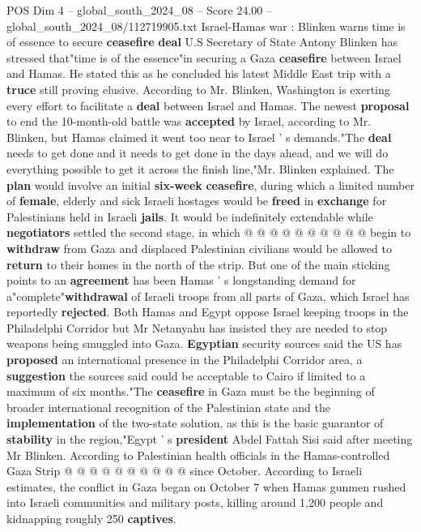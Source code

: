 \begin{textsample}{POS Dim 4 – global\_south\_2024\_08 – Score 24.00 – global\_south\_2024\_08/112719905.txt}  \label{ex:f4_pos_124}
Israel-Hamas war : Blinken warns time is of essence to secure \textbf{ceasefire} \textbf{deal} U.S Secretary of State Antony Blinken has stressed that"time is of the essence"in securing a Gaza \textbf{ceasefire} between Israel and Hamas.
He stated this as he concluded his latest Middle East trip with a \textbf{truce} still proving elusive.
According to Mr.
Blinken, Washington is exerting every effort to facilitate a \textbf{deal} between Israel and Hamas.
The newest \textbf{proposal} to end the 10-month-old battle was \textbf{accepted} by Israel, according to Mr.
Blinken, but Hamas claimed it went too near to Israel ' s demands."The \textbf{deal} needs to get done and it needs to get done in the days ahead, and we will do everything possible to get it across the finish line,"Mr.
Blinken explained.
The \textbf{plan} would involve an initial \textbf{six-week} \textbf{ceasefire}, during which a limited number of \textbf{female}, elderly and sick Israeli hostages would be \textbf{freed} in \textbf{exchange} for Palestinians held in Israeli \textbf{jails}.
It would be indefinitely extendable while \textbf{negotiators} settled the second stage, in which @ @ @ @ @ @ @ @ @ @ begin to \textbf{withdraw} from Gaza and displaced Palestinian civilians would be allowed to \textbf{return} to their homes in the north of the strip.
But one of the main sticking points to an \textbf{agreement} has been Hamas ' s longstanding demand for a"complete"\textbf{withdrawal} of Israeli troops from all parts of Gaza, which Israel has reportedly \textbf{rejected}.
Both Hamas and Egypt oppose Israel keeping troops in the Philadelphi Corridor but Mr Netanyahu has insisted they are needed to stop weapons being smuggled into Gaza. \textbf{Egyptian} security sources said the US has \textbf{proposed} an international presence in the Philadelphi Corridor area, a \textbf{suggestion} the sources said could be acceptable to Cairo if limited to a maximum of six months."The \textbf{ceasefire} in Gaza must be the beginning of broader international recognition of the Palestinian state and the \textbf{implementation} of the two-state solution, as this is the basic guarantor of \textbf{stability} in the region,"Egypt ' s \textbf{president} Abdel Fattah Sisi said after meeting Mr Blinken.
According to Palestinian health officials in the Hamas-controlled Gaza Strip @ @ @ @ @ @ @ @ @ @ since October.
According to Israeli estimates, the conflict in Gaza began on October 7 when Hamas gunmen rushed into Israeli communities and military posts, killing around 1,200 people and kidnapping roughly 250 \textbf{captives}.

\end{textsample}
